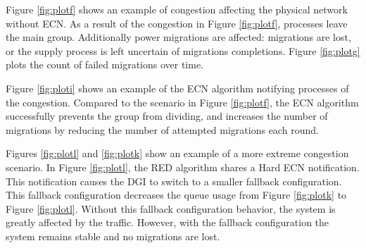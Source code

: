 Figure \ref{fig:plotf} shows an example of congestion affecting the physical network without \ac{ECN}.
As a result of the congestion in Figure \ref{fig:plotf}, processes leave the main group.
Additionally power migrations are affected: migrations are lost, or the supply process is left uncertain of migrations completions.
Figure \ref{fig:plotg} plots the count of failed migrations over time.

Figure \ref{fig:ploti} shows an example of the \ac{ECN} algorithm notifying processes of the congestion.
Compared to the scenario in Figure \ref{fig:plotf}, the \ac{ECN} algorithm successfully prevents the group from dividing, and increases the number of migrations by reducing the number of attempted migrations each round.

Figures \ref{fig:plotl} and \ref{fig:plotk} show an example of a more extreme congestion scenario.
In Figure \ref{fig:plotl}, the \ac{RED} algorithm shares a Hard \ac{ECN} notification.
This notification causes the \ac{DGI} to switch to a smaller fallback configuration.
This fallback configuration decreases the queue usage from Figure \ref{fig:plotk} to Figure \ref{fig:plotl}.
Without this fallback configuration behavior, the system is greatly affected by the traffic.
However, with the fallback configuration the system remains stable and no migrations are lost.

